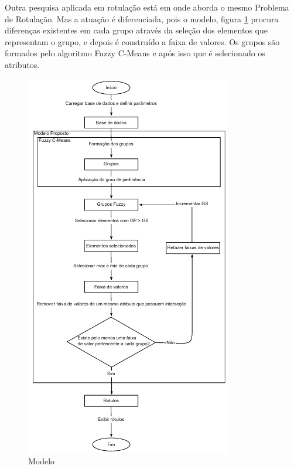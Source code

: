 Outra pesquisa aplicada em rotulação está em \cite{Filho2015} onde aborda o mesmo Problema de Rotulação. Mas a atuação é diferenciada, pois o modelo, figura \ref{fig:modeloFilhoVilmar} procura diferenças existentes em cada grupo através da seleção dos elementos que representam o grupo, e depois é construído a faixa de valores. Os grupos são formados pelo algoritmo Fuzzy C-Means e após isso que é selecionado os atributos. 
\begin{figure}[!h]
        \centering
        \includegraphics[scale=0.8]{figs/modeloRotFuzzy.png}
        \caption{Modelo \cite{Filho2015}} \label{fig:modeloFilhoVilmar}
\end{figure}






